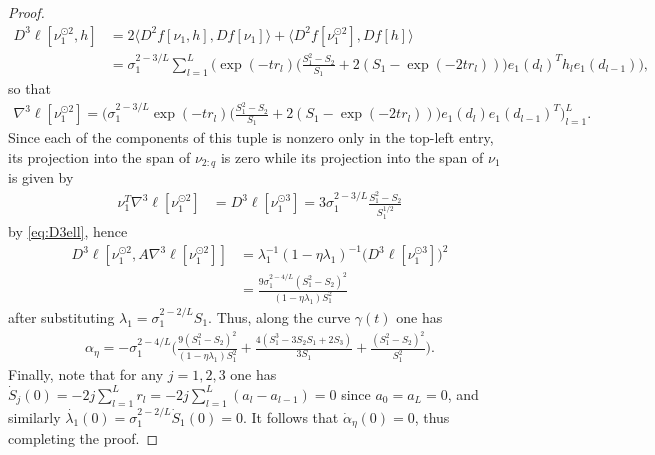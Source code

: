 \documentclass[10pt,a4paper]{amsart}
\begin{document}
\begin{proof}
\begin{align}
        D^3\ell[\nu_1^{\odot 2},h] &= 2\langle D^2f[\nu_1,h],Df[\nu_1]\rangle + \langle D^2f[\nu_1^{\odot 2}],Df[h]\rangle\\&=\sigma_1^{2-3/L}\sum_{l=1}^L\bigg(\exp(-tr_l)\bigg(\frac{S_1^2-S_2}{S_1} + 2(S_1-\exp(-2tr_l))\bigg)e_1(d_l)^Th_le_1(d_{l-1})\bigg),
    \end{align}
    so that
    \begin{align}
        \nabla^3\ell[\nu_1^{\odot 2}] = \bigg(\sigma_1^{2-3/L}\exp(-tr_l)\bigg(\frac{S_1^2-S_2}{S_1} + 2(S_1-\exp(-2tr_l))\bigg)e_1(d_l)e_1(d_{l-1})^T\bigg)_{l=1}^L.
    \end{align}
    Since each of the components of this tuple is nonzero only in the top-left entry, its projection into the span of $\nu_{2:q}$ is zero while its projection into the span of $\nu_1$ is given by
    \begin{align}
        \nu_1^T\nabla^3\ell[\nu_1^{\odot 2}] &= D^3\ell[\nu_1^{\odot 3}] = 3\sigma_1^{2-3/L}\frac{S_1^2-S_2}{S_1^{1/2}}
    \end{align}
    by \eqref{eq:D3ell}, hence
    \begin{align}
        D^3\ell[\nu_1^{\odot 2},A\nabla^3\ell[\nu_1^{\odot 2}]] &= \lambda_1^{-1}(1-\eta\lambda_1)^{-1}\big(D^3\ell[\nu_1^{\odot 3}]\big)^2\\&=\frac{9\sigma_1^{2-4/L}(S_1^2-S_2)^2}{(1-\eta\lambda_1)S_1^2}
    \end{align}
    after substituting $\lambda_1 = \sigma_1^{2-2/L}S_1$. Thus, along the curve $\gamma(t)$ one has
    \begin{align}
        \alpha_{\eta} = -\sigma_1^{2-4/L}\bigg(\frac{9(S_1^2-S_2)^2}{(1-\eta\lambda_1)S_1^2} + \frac{4(S_1^3-3S_2S_1+2S_3)}{3S_1} + \frac{(S_1^2-S_2)^2}{S_1^2}\bigg).
    \end{align}
    Finally, note that for any $j=1,2,3$ one has $\dot{S}_j(0) = -2j\sum_{l=1}^Lr_l = -2j\sum_{l=1}^L(a_l-a_{l-1}) = 0$ since $a_0 = a_L = 0$, and similarly $\dot{\lambda_1}(0) = \sigma_1^{2-2/L}\dot{S}_1(0) = 0$. It follows that $\dot{\alpha}_{\eta}(0) = 0$, thus completing the proof.
\end{proof}
\end{document}
